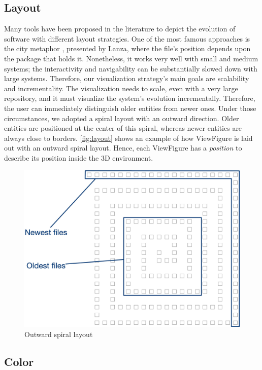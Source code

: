 \subsection*{Layout}
Many tools have been proposed in the literature to depict the evolution of software with different layout strategies. 
One of the most famous approaches is the city metaphor \cite{Wettel2007}, presented by Lanza, where the file's position depends upon the package that holds it. 
Nonetheless, it works very well with small and medium systems; the interactivity and navigability can be substantially slowed down with large systems.
\bigbreak
Therefore, our visualization strategy's main goals are scalability and incrementality. The visualization needs to scale, even with a very large repository, and it must visualize the system's evolution incrementally. Therefore, the user can immediately distinguish older entities from newer ones.
\bigbreak
Under those circumstances, we adopted a spiral layout with an outward direction. Older entities are positioned at the center of this spiral, whereas newer entities are always close to borders. 
\autoref{fig:layout} shows an example of how ViewFigure is laid out with an outward spiral layout.
\bigbreak
Hence, each ViewFigure has a \textit{position} to describe its position inside the 3D environment. 

\begin{figure}
    \center
    \includegraphics[width=\textwidth]{SpiralLayout.jpg}
    \caption{Outward spiral layout}
    \label{fig:layout}
\end{figure}

\subsection*{Color}

